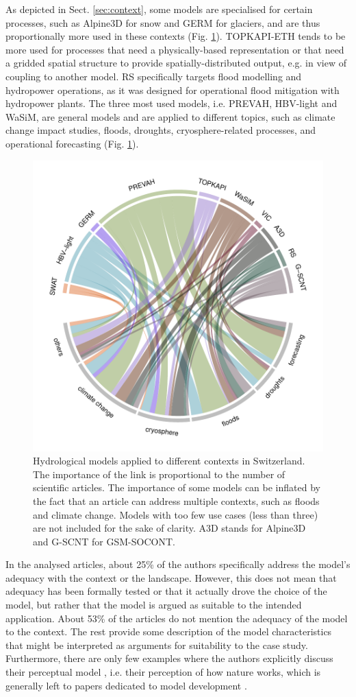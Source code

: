 \documentclass[10pt,a4paper]{article}
\begin{document}
As depicted in Sect. \ref{sec:context}, some models are specialised for certain processes, such as Alpine3D for snow and GERM for glaciers, and are thus proportionally more used in these contexts (Fig. \ref{fig:applications}). TOPKAPI-ETH tends to be more used for processes that need a physically-based representation or that need a gridded spatial structure to provide spatially-distributed output, e.g. in view of coupling to another model. RS specifically targets flood modelling and hydropower operations, as it was designed for operational flood mitigation with hydropower plants. The three most used models, i.e. PREVAH, HBV-light and WaSiM, are general models and are applied to different topics, such as climate change impact studies, floods, droughts, cryosphere-related processes, and operational forecasting (Fig. \ref{fig:applications}).

\begin{figure}[htb]
	\begin{center}
		\includegraphics[width=0.70\columnwidth]{figures/chord_diagram_contexts}
		\caption{{Hydrological models applied to different contexts in Switzerland. The importance of the link is proportional to the number of scientific articles. The importance of some models can be inflated by the fact that an article can address multiple contexts, such as floods and climate change. Models with too few use cases (less than three) are not included for the sake of clarity. A3D stands for Alpine3D and G-SCNT for GSM-SOCONT. 
		{\label{fig:applications}}
		}}
	\end{center}
\end{figure}

In the analysed articles, about 25\% of the authors specifically address the model's adequacy with the context or the landscape. However, this does not mean that adequacy has been formally tested or that it actually drove the choice of the model, but rather that the model is argued as suitable to the intended application. About 53\% of the articles do not mention the adequacy of the model to the context. The rest provide some description of the model characteristics that might be interpreted as arguments for suitability to the case study. Furthermore, there are only few examples where the authors explicitly discuss their 
perceptual model \citep{Beven2021}, i.e. their perception of how nature works, which is generally left to papers dedicated to model development .
\end{document}

